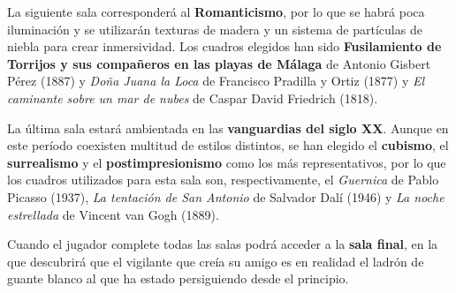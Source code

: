 La siguiente sala corresponderá al \textbf{Romanticismo}, por lo que se habrá poca iluminación y se utilizarán texturas de madera y un sistema de partículas de niebla para crear inmersividad. Los cuadros elegidos han sido \textbf{Fusilamiento de Torrijos y sus compañeros en las playas de Málaga} de Antonio Gisbert Pérez (1887) y \textit{Doña Juana la Loca} de Francisco Pradilla y Ortiz (1877) y \textit{El caminante sobre un mar de nubes} de Caspar David Friedrich (1818).

La última sala estará ambientada en las \textbf{vanguardias del siglo XX}. Aunque en este período coexisten multitud de estilos distintos, se han elegido el \textbf{cubismo}, el \textbf{surrealismo} y el \textbf{postimpresionismo} como los más representativos, por lo que los cuadros utilizados para esta sala son, respectivamente, el \textit{Guernica} de Pablo Picasso (1937), \textit{La tentación de San Antonio} de Salvador Dalí (1946) y \textit{La noche estrellada} de Vincent van Gogh (1889).

Cuando el jugador complete todas las salas podrá acceder a la \textbf{sala final}, en la que descubrirá que el vigilante que creía su amigo es en realidad el ladrón de guante blanco al que ha estado persiguiendo desde el principio.
